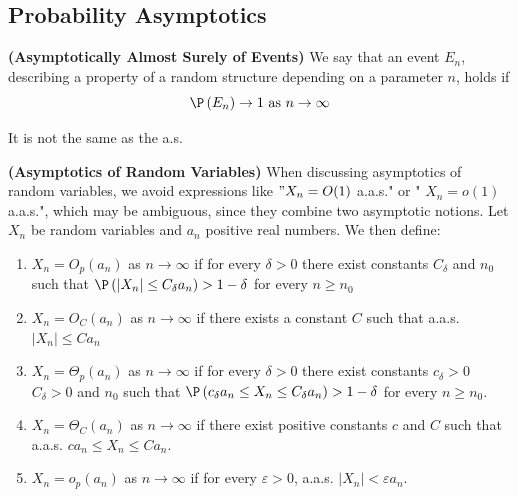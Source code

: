 \documentclass{article}
\newcommand{\bfs}[1]{\textbf{({#1}) }}
\begin{document}
\subsection{Probability Asymptotics}
\begin{defa}{\bfs{Asymptotically Almost Surely of Events}}
 We say that an event $E _{n}$, describing a property of a random structure depending on a parameter $n$, holds  if $$\P \left( E _{n}\right) \rightarrow 1 \text{ as } n \rightarrow \infty$$
\end{defa}
\begin{rema}
It is not the same as the a.s. 
\end{rema}
\begin{defa}{\bfs{Asymptotics of Random Variables}} When discussing asymptotics of random variables, we avoid expressions like $" X_{n}=O(1)$ a.a.s." or " $X_{n}=o(1)$ a.a.s.", which may be ambiguous, since they combine two asymptotic notions. Let $X_{n}$ be random variables and $a_{n}$ positive real numbers. We then define:
 \begin{enumerate}
     \item $X_{n}=O_{p}\left(a_{n}\right)$ as $n \rightarrow \infty$ if for every $\delta>0$ there exist constants $C_{\delta}$ and $n_{0}$ such that $\P \left(\left|X_{n}\right| \leq C_{\delta} a_{n}\right)>1-\delta$ for every $n \geq n_{0}$
     \item $X_{n}=O_{C}\left(a_{n}\right)$ as $n \rightarrow \infty$ if there exists a constant $C$ such that a.a.s. $\left|X_{n}\right| \leq C a_{n}$
     \item $X_{n}=\Theta_{p}\left(a_{n}\right)$ as $n \rightarrow \infty$ if for every $\delta>0$ there exist constants $c_{\delta}>0$ $C_{\delta}>0$ and $n_{0}$ such that $\P \left(c_{\delta} a_{n} \leq X_{n} \leq C_{\delta} a_{n}\right)>1-\delta$ for every $n \geq n_{0}$.
     \item $X_{n}=\Theta_{C}\left(a_{n}\right)$ as $n \rightarrow \infty$ if there exist positive constants $c$ and $C$ such that a.a.s. $c a_{n} \leq X_{n} \leq C a_{n} .$
     \item $X_{n}=o_{p}\left(a_{n}\right)$ as $n \rightarrow \infty$ if for every $\varepsilon>0$, a.a.s. $\left|X_{n}\right|<\varepsilon a_{n}$.
 \end{enumerate}
\end{defa}
\end{document}
